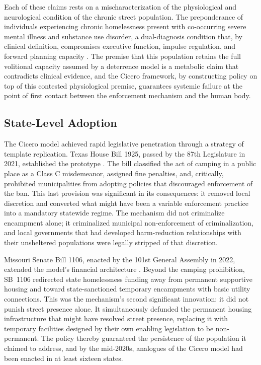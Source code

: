 \documentclass[12pt, letterpaper]{article}
\begin{document}
Each of these claims rests on a mischaracterization of the physiological and neurological condition of the chronic street population. The preponderance of individuals experiencing chronic homelessness present with co-occurring severe mental illness and substance use disorder, a dual-diagnosis condition that, by clinical definition, compromises executive function, impulse regulation, and forward planning capacity \citep{dibella_wp1_2026}. The premise that this population retains the full volitional capacity assumed by a deterrence model is a metabolic claim that contradicts clinical evidence, and the Cicero framework, by constructing policy on top of this contested physiological premise, guarantees systemic failure at the point of first contact between the enforcement mechanism and the human body.

\subsection{State-Level Adoption}

The Cicero model achieved rapid legislative penetration through a strategy of template replication. Texas House Bill 1925, passed by the 87th Legislature in 2021, established the prototype \citep{tx_hb1925_2021}. The bill classified the act of camping in a public place as a Class C misdemeanor, assigned fine penalties, and, critically, prohibited municipalities from adopting policies that discouraged enforcement of the ban. This last provision was significant in its consequences: it removed local discretion and converted what might have been a variable enforcement practice into a mandatory statewide regime. The mechanism did not criminalize encampment alone; it criminalized municipal non-enforcement of criminalization, and local governments that had developed harm-reduction relationships with their unsheltered populations were legally stripped of that discretion.

Missouri Senate Bill 1106, enacted by the 101st General Assembly in 2022, extended the model's financial architecture \citep{mo_sb1106_2022}. Beyond the camping prohibition, SB~1106 redirected state homelessness funding away from permanent supportive housing and toward state-sanctioned temporary encampments with basic utility connections. This was the mechanism's second significant innovation: it did not punish street presence alone. It simultaneously defunded the permanent housing infrastructure that might have resolved street presence, replacing it with temporary facilities designed by their own enabling legislation to be non-permanent. The policy thereby guaranteed the persistence of the population it claimed to address, and by the mid-2020s, analogues of the Cicero model had been enacted in at least sixteen states.
\end{document}
